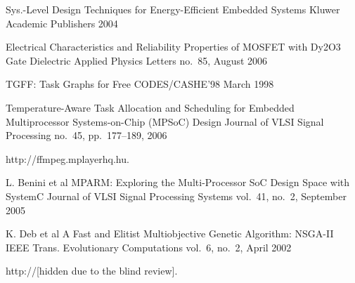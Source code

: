 \begin{thebibliography}{99}
    \publication
      {}
      {Sys.-Level Design Techniques for Energy-Efficient Embedded Systems}
      {Kluwer Academic Publishers}
      {2004}

    \publication
      {}
      {Electrical Characteristics and Reliability Properties of MOSFET with Dy2O3 Gate Dielectric}
      {Applied Physics Letters}
      {no.~85, August 2006}


    \publication
      {}
      {TGFF: Task Graphs for Free}
      {CODES/CASHE'98}
      {March 1998}

    \publication
      {}
      {Temperature-Aware Task Allocation and Scheduling for Embedded Multiprocessor Systems-on-Chip (MPSoC) Design}
      {Journal of VLSI Signal Processing}
      {no.~45, pp.~177--189, 2006}

    http://ffmpeg.mplayerhq.hu.

    \publication
      {L. Benini et al}
      {MPARM: Exploring the Multi-Processor SoC Design Space with SystemC}
      {Journal of VLSI Signal Processing Systems}
      {vol.~41, no.~2, September 2005}

    \publication
      {K. Deb et al}
      {A Fast and Elitist Multiobjective Genetic Algorithm: NSGA-II}
      {IEEE Trans. Evolutionary Computations}
      {vol.~6, no.~2, April 2002}

    http://[hidden due to the blind review].

\end{thebibliography}
